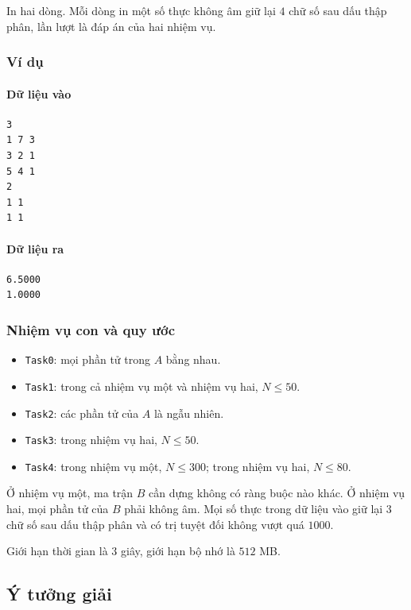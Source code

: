 \documentclass[11pt]{article}
\begin{document}
In hai dòng. Mỗi dòng in một số thực không âm giữ lại \(4\) chữ số sau dấu thập
phân, lần lượt là đáp án của hai nhiệm vụ.

\subsubsection{Ví dụ}

\paragraph{Dữ liệu vào}
\begin{verbatim}
3
1 7 3
3 2 1
5 4 1
2
1 1
1 1
\end{verbatim}

\paragraph{Dữ liệu ra}
\begin{verbatim}
6.5000
1.0000
\end{verbatim}

\subsubsection{Nhiệm vụ con và quy ước}

\begin{itemize}
  \item \texttt{Task0}: mọi phần tử trong \(A\) bằng nhau.
  \item \texttt{Task1}: trong cả nhiệm vụ một và nhiệm vụ hai, \(N\le 50\).
  \item \texttt{Task2}: các phần tử của \(A\) là ngẫu nhiên.
  \item \texttt{Task3}: trong nhiệm vụ hai, \(N\le 50\).
  \item \texttt{Task4}: trong nhiệm vụ một, \(N\le 300\); trong nhiệm vụ hai,
  \(N\le 80\).
\end{itemize}

Ở nhiệm vụ một, ma trận \(B\) cần dựng không có ràng buộc nào khác. Ở nhiệm vụ
hai, mọi phần tử của \(B\) phải không âm. Mọi số thực trong dữ liệu vào giữ lại
\(3\) chữ số sau dấu thập phân và có trị tuyệt đối không vượt quá \(1000\).

Giới hạn thời gian là \(3\) giây, giới hạn bộ nhớ là \(512\) MB.

\subsection{Ý tưởng giải}
\end{document}
